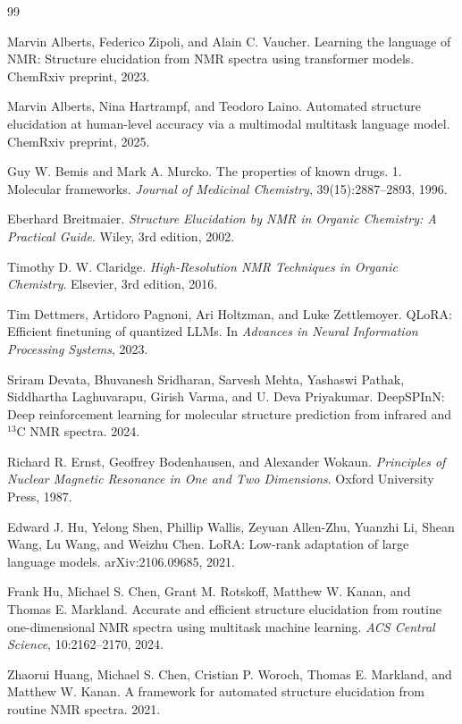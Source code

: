 \documentclass{article}
\begin{document}
{\small
\begin{thebibliography}{99}

Marvin Alberts, Federico Zipoli, and Alain C. Vaucher.
Learning the language of NMR: Structure elucidation from NMR spectra using transformer models.
ChemRxiv preprint, 2023.

Marvin Alberts, Nina Hartrampf, and Teodoro Laino.
Automated structure elucidation at human-level accuracy via a multimodal multitask language model.
ChemRxiv preprint, 2025.

Guy W. Bemis and Mark A. Murcko.
The properties of known drugs. 1. Molecular frameworks.
\textit{Journal of Medicinal Chemistry}, 39(15):2887--2893, 1996.

Eberhard Breitmaier.
\textit{Structure Elucidation by NMR in Organic Chemistry: A Practical Guide}.
Wiley, 3rd edition, 2002.

Timothy D. W. Claridge.
\textit{High-Resolution NMR Techniques in Organic Chemistry}.
Elsevier, 3rd edition, 2016.

Tim Dettmers, Artidoro Pagnoni, Ari Holtzman, and Luke Zettlemoyer.
QLoRA: Efficient finetuning of quantized LLMs.
In \textit{Advances in Neural Information Processing Systems}, 2023.

Sriram Devata, Bhuvanesh Sridharan, Sarvesh Mehta, Yashaswi Pathak, Siddhartha Laghuvarapu, Girish Varma, and U. Deva Priyakumar.
DeepSPInN: Deep reinforcement learning for molecular structure prediction from infrared and \(^{13}\)C NMR spectra.
2024.

Richard R. Ernst, Geoffrey Bodenhausen, and Alexander Wokaun.
\textit{Principles of Nuclear Magnetic Resonance in One and Two Dimensions}.
Oxford University Press, 1987.

Edward J. Hu, Yelong Shen, Phillip Wallis, Zeyuan Allen-Zhu, Yuanzhi Li, Shean Wang, Lu Wang, and Weizhu Chen.
LoRA: Low-rank adaptation of large language models.
arXiv:2106.09685, 2021.

Frank Hu, Michael S. Chen, Grant M. Rotskoff, Matthew W. Kanan, and Thomas E. Markland.
Accurate and efficient structure elucidation from routine one-dimensional NMR spectra using multitask machine learning.
\textit{ACS Central Science}, 10:2162--2170, 2024.

Zhaorui Huang, Michael S. Chen, Cristian P. Woroch, Thomas E. Markland, and Matthew W. Kanan.
A framework for automated structure elucidation from routine NMR spectra.
2021.


\end{thebibliography}}
\end{document}

